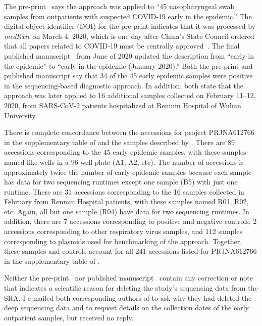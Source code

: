\documentclass[9pt,twocolumn,twoside]{gsajnl_modified}
\begin{document}
The pre-print~\citep{wang2020medRxiv} says the approach was applied to ``45 nasopharyngeal swab samples from outpatients with suspected COVID-19 early in the epidemic.''
The digital object identifier (DOI) for the pre-print indicates that it was processed by \textit{medRxiv} on March 4, 2020, which is one day after China's State Council ordered that all papers related to COVID-19 must be centrally approved~\citep{Kang2020}.
The final published manuscript~\citep{wang2020small} from June of 2020 updated the description from ``early in the epidemic'' to ``early in the epidemic (January 2020).''
Both the pre-print and published manuscript say that 34 of the 45 early epidemic samples were positive in the sequencing-based diagnostic approach.
In addition, both state that the approach was later applied to 16 additional samples collected on February 11--12, 2020, from SARS-CoV-2 patients hospitalized at Renmin Hospital of Wuhan University.

There is complete concordance between the accessions for project PRJNA612766 in the supplementary table of \citet{farkas2020insights} and the samples described by \citet{wang2020medRxiv}.
There are 89 accessions corresponding to the 45 early epidemic samples, with these samples named like wells in a 96-well plate (A1, A2, etc).
The number of accessions is approximately twice the number of early epidemic samples because each sample has data for two sequencing runtimes except one sample (B5) with just one runtime.
 There are 31 accessions corresponding to the 16 samples collected in February from Renmin Hospital patients, with these samples named R01, R02, etc.
 Again, all but one sample (R04) have data for two sequencing runtimes.
 In addition, there are 7 accessions corresponding to positive and negative controls, 2 accessions corresponding to other respiratory virus samples, and 112 samples corresponding to plasmids used for benchmarking of the approach.
 Together, these samples and controls account for all 241 accessions listed for PRJNA612766 in the supplementary table of \citet{farkas2020insights}.

Neither the pre-print~\citep{wang2020medRxiv} nor published manuscript~\citep{wang2020small} contain any correction or note that indicates a scientific reason for deleting the study's sequencing data from the SRA.
I e-mailed both corresponding authors of \citet{wang2020medRxiv} to ask why they had deleted the deep sequencing data and to request details on the collection dates of the early outpatient samples, but received no reply.
\end{document}
